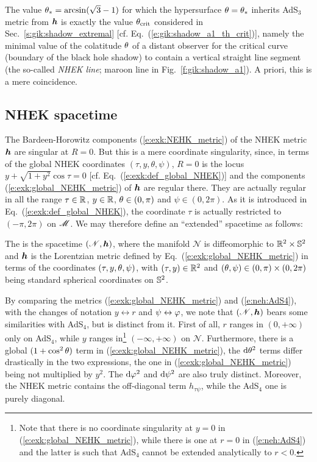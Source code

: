 \begin{remark}
The value $\theta_* = \arcsin(\sqrt{3} - 1)$ for which the hypersurface
$\theta = \theta_*$ inherits AdS$_3$ metric from $\bm{h}$ is exactly
the value $\theta_{\rm crit}$ considered in Sec.~\ref{s:gik:shadow_extremal}
[cf. Eq.~(\ref{e:gik:shadow_a1_th_crit})], namely
the minimal value of the colatitude $\theta$ of a distant observer
for the critical curve
(boundary of the black hole shadow) to contain a vertical straight line segment
(the so-called \emph{NHEK line}; maroon line in Fig.~\ref{f:gik:shadow_a1}).
A priori, this is a mere coincidence.
\end{remark}



\subsection{NHEK spacetime} \label{s:exk:NHEK_spacetime}

The Bardeen-Horowitz components (\ref{e:exk:NEHK_metric}) of the NHEK metric $\bm{h}$
are singular at $R=0$. But this is a mere coordinate singularity, since,
in terms of the global NHEK coordinates
$(\tau,y,\theta,\psi)$, $R=0$ is the locus $y + \sqrt{1 + y^2}\cos\tau = 0$
[cf. Eq.~(\ref{e:exk:def_global_NHEK})] and
the components (\ref{e:exk:global_NEHK_metric})
of $\bm{h}$ are regular there.
They are actually regular in all the range $\tau\in\mathbb{R}$, $y\in\mathbb{R}$, $\theta\in(0,\pi)$
and $\psi\in(0,2\pi)$.
As it is introduced in Eq.~(\ref{e:exk:def_global_NHEK}),
the coordinate $\tau$ is actually restricted to $(-\pi, 2\pi)$ on $\mathscr{M}$. We may therefore
define an ``extended'' spacetime as follows:
\begin{greybox}
The  is the spacetime $(\mathscr{N},\bm{h})$, where
the manifold $\mathscr{N}$ is diffeomorphic to $\mathbb{R}^2\times \mathbb{S}^2$ and $\bm{h}$ is the
Lorentzian metric defined by Eq.~(\ref{e:exk:global_NEHK_metric}) in terms
of the coordinates $(\tau,y,\theta,\psi)$, with $(\tau,y)\in \mathbb{R}^2$ and
$(\theta,\psi)\in(0,\pi)\times(0,2\pi)$ being standard spherical coordinates on $\mathbb{S}^2$.
\end{greybox}
By comparing the metrics (\ref{e:exk:global_NEHK_metric}) and
(\ref{e:neh:AdS4}), with the changes of notation $y\leftrightarrow r$
and $\psi\leftrightarrow \varphi$, we note that
$(\mathscr{N},\bm{h})$ bears some similarities with AdS$_4$, but is
distinct from it. First of all, $r$ ranges in $(0, +\infty)$ only
on AdS$_4$, while $y$ ranges in\footnote{Note that there
is no coordinate singularity at $y=0$ in (\ref{e:exk:global_NEHK_metric}), while
there is one at $r=0$ in (\ref{e:neh:AdS4}) and the latter is such that AdS$_4$ cannot
be extended analytically to $r<0$.} $(-\infty, +\infty)$ on $\mathscr{N}$.
Furthermore, there is a global $(1 + \cos^2\theta)$ term in (\ref{e:exk:global_NEHK_metric}),
the $\mathrm{d}\theta^2$ terms differ drastically in the two expressions, the one in
(\ref{e:exk:global_NEHK_metric}) being not multiplied by $y^2$.
The $\mathrm{d}\varphi^2$ and $\mathrm{d}\psi^2$ are also truly distinct. Moreover, the NHEK metric
contains the off-diagonal term $h_{\tau\psi}$, while
the AdS$_4$ one is purely diagonal.


